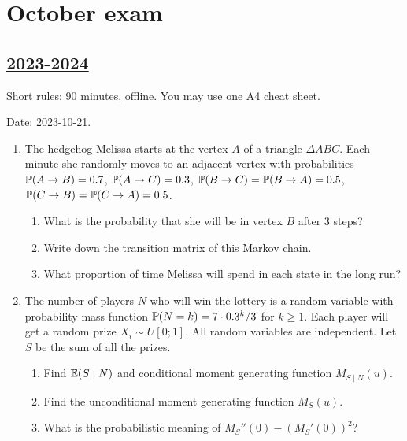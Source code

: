 
\newpage
\thispagestyle{empty}
\section{October exam}



\subsection[2023-2024]{\hyperref[sec:sol_kr_01_2023_2024]{2023-2024}}
\label{sec:kr_01_2023_2024} %

Short rules: 90 minutes, offline. You may use one A4 cheat sheet.

Date: 2023-10-21.


\begin{enumerate}
  \item The hedgehog Melissa starts at the vertex $A$ of a triangle $\Delta ABC$.
  Each minute she randomly moves to an adjacent vertex with probabilities $\P(A \to B) = 0.7$, 
  $\P(A \to C) = 0.3$, $\P(B \to C) = \P(B \to A) = 0.5$,  $\P(C \to B) = \P(C \to A) = 0.5$.

  \begin{enumerate}
    \item What is the probability that she will be in vertex $B$ after 3 steps?
    \item Write down the transition matrix of this Markov chain. 
    \item What proportion of time Melissa will spend in each state in the long run?
  \end{enumerate}
  
  \item The number of players $N$ who will win the lottery
  is a random variable with probability mass function $\P(N = k) = 7\cdot 0.3^k / 3$ for $k\geq 1$.
  Each player will get a random prize $X_i \sim U[0;1]$.
  All random variables are independent. 
  Let $S$ be the sum of all the prizes. 

  \begin{enumerate}
    \item Find $\E(S \mid N)$ and conditional moment generating function $M_{S\mid N}(u)$.
    \item Find the unconditional moment generating function $M_S(u)$.
    \item What is the probabilistic meaning of $M_S''(0) - (M_S'(0))^2$? 
  \end{enumerate}


\end{enumerate}
